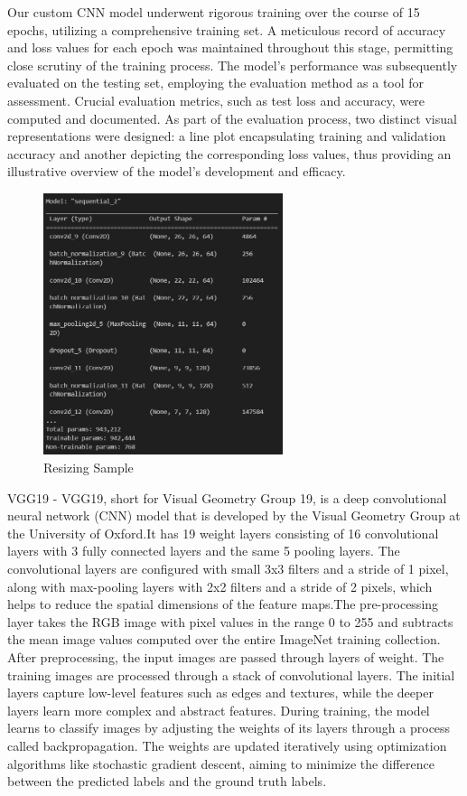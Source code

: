 \documentclass[conference]{IEEEtran}
\begin{document}
Our custom CNN model underwent rigorous training over the course of 15 epochs, utilizing a comprehensive training set. A meticulous record of accuracy and loss values for each epoch was maintained throughout this stage, permitting close scrutiny of the training process. The model's performance was subsequently evaluated on the testing set, employing the evaluation method as a tool for assessment. Crucial evaluation metrics, such as test loss and accuracy, were computed and documented. As part of the evaluation process, two distinct visual representations were designed: a line plot encapsulating training and validation accuracy and another depicting the corresponding loss values, thus providing an illustrative overview of the model's development and efficacy.
\begin{figure}[htp]
    \centering
    \includegraphics[width=7cm]{images/WhatsApp Image 2023-05-22 at 3.34.52 PM.jpeg}
    \caption{Resizing Sample}
    \label{fig:CNN MOdel Architecture}
\end{figure}
VGG19 - VGG19, short for Visual Geometry Group 19, is  a deep convolutional neural network (CNN) model that is developed by the Visual Geometry Group at the University of Oxford.It has 19 weight layers consisting of 16 convolutional layers with 3 fully connected layers and the same 5 pooling layers. The convolutional layers are configured with small 3x3 filters and a stride of 1 pixel, along with max-pooling layers with 2x2 filters and a stride of 2 pixels, which helps to reduce the spatial dimensions of the feature maps.The pre-processing layer takes the RGB image with pixel values in the range 0 to 255 and subtracts the mean image values computed over the entire ImageNet training collection. After preprocessing, the input images are passed through layers of weight. The training images are processed through a stack of convolutional layers. 
The initial layers capture low-level features such as edges and textures, while the deeper layers learn more complex and abstract features. During training, the model learns to classify images by adjusting the weights of its layers through a process called backpropagation. The weights are updated iteratively using optimization algorithms like stochastic gradient descent, aiming to minimize the difference between the predicted labels and the ground truth labels.
\end{document}
